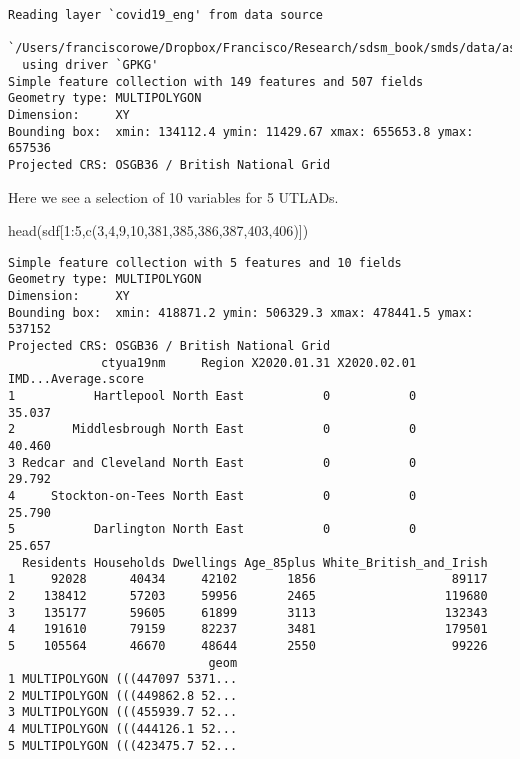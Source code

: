 \documentclass[
  letterpaper,
  krantz2]{style/krantz}
\newenvironment{Shaded}{\begin{snugshade}}{\end{snugshade}}
\newcommand{\DecValTok}[1]{\textcolor[rgb]{0.68,0.00,0.00}{#1}}
\newcommand{\FunctionTok}[1]{\textcolor[rgb]{0.28,0.35,0.67}{#1}}
\newcommand{\NormalTok}[1]{\textcolor[rgb]{0.00,0.23,0.31}{#1}}
\newcommand{\SpecialCharTok}[1]{\textcolor[rgb]{0.37,0.37,0.37}{#1}}
\begin{document}
\begin{verbatim}
Reading layer `covid19_eng' from data source 
  `/Users/franciscorowe/Dropbox/Francisco/Research/sdsm_book/smds/data/assignment_2_covid/covid19_eng.gpkg' 
  using driver `GPKG'
Simple feature collection with 149 features and 507 fields
Geometry type: MULTIPOLYGON
Dimension:     XY
Bounding box:  xmin: 134112.4 ymin: 11429.67 xmax: 655653.8 ymax: 657536
Projected CRS: OSGB36 / British National Grid
\end{verbatim}

Here we see a selection of 10 variables for 5 UTLADs.

\begin{Shaded}
\begin{Highlighting}[]
\FunctionTok{head}\NormalTok{(sdf[}\DecValTok{1}\SpecialCharTok{:}\DecValTok{5}\NormalTok{,}\FunctionTok{c}\NormalTok{(}\DecValTok{3}\NormalTok{,}\DecValTok{4}\NormalTok{,}\DecValTok{9}\NormalTok{,}\DecValTok{10}\NormalTok{,}\DecValTok{381}\NormalTok{,}\DecValTok{385}\NormalTok{,}\DecValTok{386}\NormalTok{,}\DecValTok{387}\NormalTok{,}\DecValTok{403}\NormalTok{,}\DecValTok{406}\NormalTok{)])}
\end{Highlighting}
\end{Shaded}

\begin{verbatim}
Simple feature collection with 5 features and 10 fields
Geometry type: MULTIPOLYGON
Dimension:     XY
Bounding box:  xmin: 418871.2 ymin: 506329.3 xmax: 478441.5 ymax: 537152
Projected CRS: OSGB36 / British National Grid
             ctyua19nm     Region X2020.01.31 X2020.02.01 IMD...Average.score
1           Hartlepool North East           0           0              35.037
2        Middlesbrough North East           0           0              40.460
3 Redcar and Cleveland North East           0           0              29.792
4     Stockton-on-Tees North East           0           0              25.790
5           Darlington North East           0           0              25.657
  Residents Households Dwellings Age_85plus White_British_and_Irish
1     92028      40434     42102       1856                   89117
2    138412      57203     59956       2465                  119680
3    135177      59605     61899       3113                  132343
4    191610      79159     82237       3481                  179501
5    105564      46670     48644       2550                   99226
                            geom
1 MULTIPOLYGON (((447097 5371...
2 MULTIPOLYGON (((449862.8 52...
3 MULTIPOLYGON (((455939.7 52...
4 MULTIPOLYGON (((444126.1 52...
5 MULTIPOLYGON (((423475.7 52...
\end{verbatim}
\end{document}
